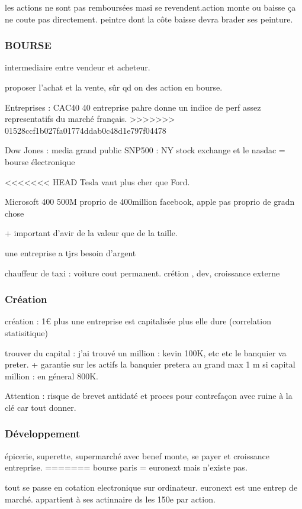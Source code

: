 \documentclass[a4paper,12pt]{article}
\begin{document}
les actions ne sont pas remboursées masi se revendent.action monte ou baisse ça ne coute pas directement.
peintre dont la côte baisse devra brader ses peinture.

\subsubsection{BOURSE}
intermediaire entre vendeur et acheteur.

proposer l'achat et la vente, sûr qd on des action en bourse.

Entreprises : CAC40 40 entreprise pahre  donne un indice de perf assez representatifs du marché français.
>>>>>>> 01528ccf1b027fa01774ddab0c48d1e797f04478

Dow Jones : media grand public
SNP500 : 
NY stock exchange et le nasdac = bourse électronique

<<<<<<< HEAD
Tesla vaut plus cher que Ford.

Microsoft 400 500M proprio de 400million
facebook, apple pas proprio de gradn chose

+ important d'avir de la valeur que de la taille.


une entreprise a tjrs besoin d'argent

chauffeur de taxi : voiture cout permanent. crétion , dev, croissance externe

\subsubsection{Création}
création : 1€  plus une entreprise est capitalisée plus elle dure (correlation statisitique)

trouver du capital : j'ai trouvé un million : kevin 100K, etc  etc 
le banquier va preter. + garantie sur les actifs la banquier pretera au grand max
1 m si capital million : en géneral 800K.

Attention : risque de brevet antidaté et proces pour contrefaçon avec ruine à la clé car tout donner.

\subsubsection{Développement}

épicerie, superette, supermarché avec benef monte, se payer et croissance entreprise. 
=======
bourse paris = euronext mais n'existe pas.

tout se passe en cotation electronique sur ordinateur.
euronext est une entrep de marché. appartient à ses actinnaire ds les 150e par action.
\end{document}
